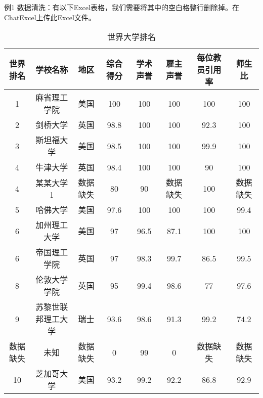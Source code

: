 例1 数据清洗：有以下Excel表格，我们需要将其中的空白格整行删除掉。在ChatExcel上传此Excel文件。
\begin{table}[h]
    \centering
    \footnotesize
    \begin{tabular}{cccccccc}
        \toprule
        世界排名 & 学校名称 & 地区 & 综合得分 & 学术声誉 & 雇主声誉 & 每位教员引用率 & 师生比 \\
        \midrule
        1  & 麻省理工学院     & 美国 & 100  & 100  & 100  & 100  & 100  \\
        2  & 剑桥大学         & 英国 & 98.8 & 100  & 100  & 92.3 & 100  \\
        3  & 斯坦福大学       & 美国 & 98.5 & 100  & 100  & 99.9 & 100  \\
        4  & 牛津大学         & 英国 & 98.4 & 100  & 100  & 90   & 100  \\
        4  & 某某大学1        & 数据缺失 & 80   & 90   & 数据缺失 & 100  & 数据缺失 \\
        5  & 哈佛大学         & 美国 & 97.6 & 100  & 100  & 100  & 99.4 \\
        6  & 加州理工大学     & 美国 & 97   & 96.5 & 87.1 & 100  & 100  \\
        6  & 帝国理工学院     & 英国 & 97   & 98.3 & 99.7 & 86.5 & 99.5 \\
        8  & 伦敦大学学院     & 英国 & 95   & 99.4 & 98.6 & 77   & 97.6 \\
        9  & 苏黎世联邦理工大学 & 瑞士 & 93.6 & 98.6 & 91.3 & 99.2 & 74.2 \\
        数据缺失  & 未知             & 数据缺失 & 0    & 99   & 0    & 数据缺失 & 数据缺失 \\
        10 & 芝加哥大学       & 美国 & 93.2 & 99.2 & 92.2 & 86.8 & 92.9 \\
        \bottomrule
    \end{tabular}
    \caption{世界大学排名}
    \label{tab:world_ranking}
\end{table}
\FloatBarrier





